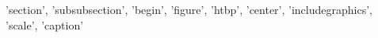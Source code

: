 {'section', 'subsubsection', 'begin', 'figure', 'htbp', 'center', 'includegraphics', 'scale', 'caption'}
